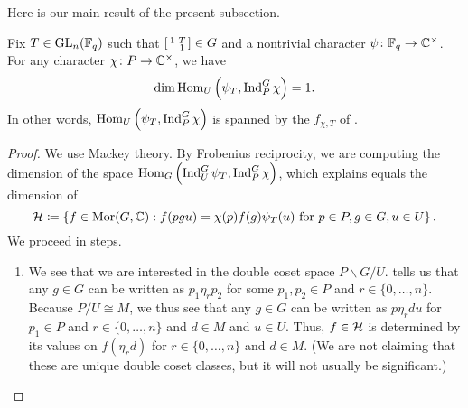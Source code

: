 Here is our main result of the present subsection.
\begin{proposition} \label{prop:psi-t-mult-one}
	Fix $T\in\mathrm{GL}_n(\mathbb F_q)$ such that $\begin{bsmallmatrix}
		1 & T \\ & 1
	\end{bsmallmatrix}\in G$ and a nontrivial character $\psi\colon\mathbb F_q\to\mathbb C^\times$. For any character $\chi\colon P\to\mathbb C^\times$, we have
	\[\dim\operatorname{Hom}_U\left(\psi_T,\operatorname{Ind}_P^G\chi\right)=1.\]
	In other words, $\operatorname{Hom}_U\left(\psi_T,\operatorname{Ind}_P^G\chi\right)$ is spanned by the $f_{\chi,T}$ of .
\end{proposition}
\begin{proof}
	We use Mackey theory. By Frobenius reciprocity, we are computing the dimension of the space $\operatorname{Hom}_G\left(\operatorname{Ind}_U^G\psi_T,\operatorname{Ind}_P^G\chi\right)$, which \cite[Theorem~32.1]{bump-lie-group} explains equals the dimension of
	\[\mathcal{H}\coloneqq\left\{f\in\operatorname{Mor}(G,\mathbb C):f(pgu)=\chi(p)f(g)\psi_T(u)\text{ for }p\in P,g\in G,u\in U\right\}.\]
	We proceed in steps.
	\begin{enumerate}
		\item We see that we are interested in the double coset space $P\backslash G/U$.  tells us that any $g\in G$ can be written as $p_1\eta_rp_2$ for some $p_1,p_2\in P$ and $r\in\{0,\ldots,n\}$. Because $P/U\cong M$, we thus see that any $g\in G$ can be written as $p\eta_rdu$ for $p_1\in P$ and $r\in\{0,\ldots,n\}$ and $d\in M$ and $u\in U$. Thus, $f\in\mathcal{H}$ is determined by its values on $f(\eta_rd)$ for $r\in\{0,\ldots,n\}$ and $d\in M$. (We are not claiming that these are unique double coset classes, but it will not usually be significant.)


\end{enumerate}
\end{proof}
